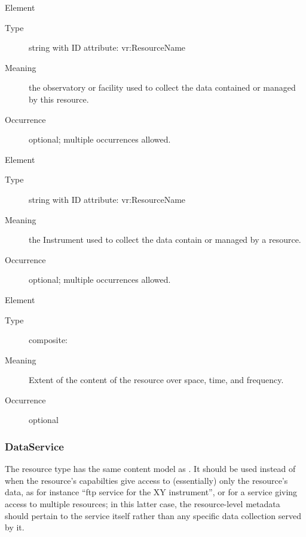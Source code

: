 \documentclass[11pt,a4paper]{ivoa}
\begin{document}
\begin{generated}
\begingroup\small\begin{bigdescription}\item[Element \xmlel{facility}]
\begin{description}
\item[Type] string with ID attribute: vr:ResourceName
\item[Meaning] 
                     the observatory or facility used to collect the data 
                     contained or managed by this resource.  
                   
\item[Occurrence] optional; multiple occurrences allowed.

\end{description}
\item[Element \xmlel{instrument}]
\begin{description}
\item[Type] string with ID attribute: vr:ResourceName
\item[Meaning] 
                     the Instrument used to collect the data contain or 
                     managed by a resource.  
                   
\item[Occurrence] optional; multiple occurrences allowed.

\end{description}
\item[Element \xmlel{coverage}]
\begin{description}
\item[Type] composite: 
\item[Meaning] 
                     Extent of the content of the resource over space, time, 
                     and frequency.
                   
\item[Occurrence] optional

\end{description}


\end{bigdescription}\endgroup

\endgroup
\end{generated}


\subsubsection{DataService}

The  resource type has the same content model as
.  It should be used instead of
 when the resource's capabilties give
access to (essentially) only the resource's data, as for instance
``ftp service for the XY instrument'', or for a service giving access
to multiple resources; in this latter case, the resource-level
metadata should pertain to the service itself rather than any specific
data collection served by it.
\end{document}
